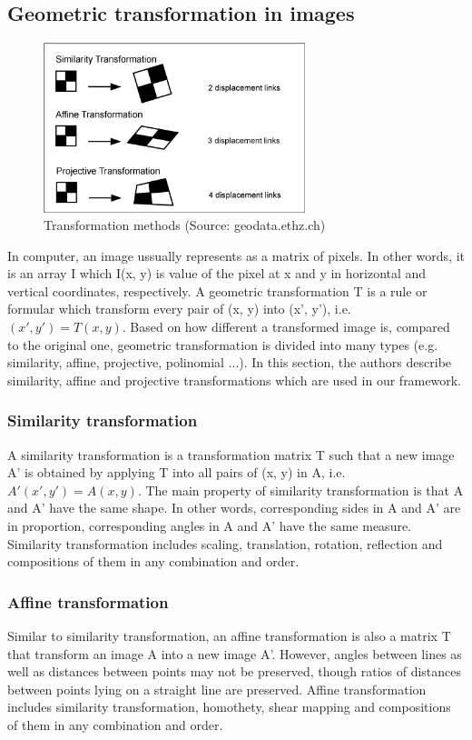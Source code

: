 \subsection{Geometric transformation in images} \label{section:geometric_transformation}

\begin{figure}
    \centering
    \includegraphics[width=3.0in]{transformation.png}
    \caption{Transformation methods (Source: geodata.ethz.ch)}
    \label{fig:image_houses}
\end{figure}

In computer, an image ussually represents as a matrix of pixels. In other words, it is an array I which I(x, y) is value of the pixel at x and y in horizontal and vertical coordinates, respectively. A geometric transformation T is a rule or formular which transform every pair of (x, y) into (x', y'), i.e. $(x', y') = T(x, y)$. Based on how different a transformed image is, compared to the original one, geometric transformation is divided into many types (e.g. similarity, affine, projective, polinomial ...). In this section, the authors describe similarity, affine and projective transformations which are used in our framework.

\subsubsection{Similarity transformation} A similarity transformation is a transformation matrix T such that a new image A' is obtained by applying T into all pairs of (x, y) in A, i.e. $A'(x', y') = A(x, y)$. The main property of similarity transformation is that A and A' have the same shape. In other words, corresponding sides in A and A' are in proportion, corresponding angles in A and A' have the same measure. Similarity transformation includes scaling, translation, rotation, reflection and compositions of them in any combination and order.

\subsubsection{Affine transformation} Similar to similarity transformation, an affine transformation is also a matrix T that transform an image A into a new image A'. However, angles between lines as well as distances between points may not be preserved, though ratios of distances between points lying on a straight line are preserved. Affine transformation includes similarity transformation, homothety, shear mapping and compositions of them in any combination and order.

